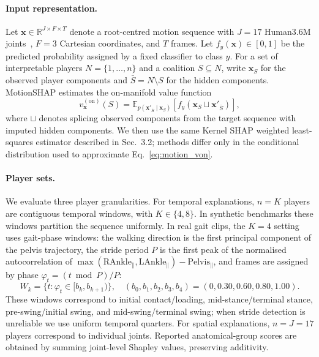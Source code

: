 
\paragraph{Input representation.}
Let $\mathbf{x}\in\mathbb{R}^{J\times F\times T}$ denote a root-centred motion sequence with $J{=}17$ Human3.6M joints~\citep{ionescu2014human36m}, $F{=}3$ Cartesian coordinates, and $T$ frames.  Let $f_y(\mathbf{x})\in[0,1]$ be the predicted probability assigned by a fixed classifier to class $y$.  For a set of interpretable players $N=\{1,\ldots,n\}$ and a coalition $S\subseteq N$, write $\mathbf{x}_S$ for the observed player components and $\bar S=N\setminus S$ for the hidden components.  MotionSHAP estimates the on-manifold value function
\begin{equation}
  v^{(\mathrm{on})}_{\mathbf{x}}(S)
  =
  \mathbb{E}_{p(\mathbf{x}'_{\bar S}\mid \mathbf{x}_S)}
  \left[
    f_y\!\left(\mathbf{x}_S\sqcup \mathbf{x}'_{\bar S}\right)
  \right],
  \label{eq:motion_von}
\end{equation}
where $\sqcup$ denotes splicing observed components from the target sequence with imputed hidden components.  We then use the same Kernel SHAP weighted least-squares estimator described in Sec.~3.2; methods differ only in the conditional distribution used to approximate Eq.~\eqref{eq:motion_von}.

\paragraph{Player sets.}
We evaluate three player granularities.  For temporal explanations, $n=K$ players are contiguous temporal windows, with $K\in\{4,8\}$.  In synthetic benchmarks these windows partition the sequence uniformly.  In real gait clips, the $K{=}4$ setting uses gait-phase windows: the walking direction is the first principal component of the pelvis trajectory, the stride period $P$ is the first peak of the normalised autocorrelation of $\max(\mathrm{RAnkle}_{\parallel},\mathrm{LAnkle}_{\parallel})-\mathrm{Pelvis}_{\parallel}$, and frames are assigned by phase $\varphi_t=(t\bmod P)/P$:
\begin{equation}
  W_k=\{t:\varphi_t\in[b_k,b_{k+1})\},
  \quad
  (b_0,b_1,b_2,b_3,b_4)=(0,0.30,0.60,0.80,1.00).
  \label{eq:windows}
\end{equation}
These windows correspond to initial contact/loading, mid-stance/terminal stance, pre-swing/initial swing, and mid-swing/terminal swing; when stride detection is unreliable we use uniform temporal quarters.  For spatial explanations, $n=J=17$ players correspond to individual joints.  Reported anatomical-group scores are obtained by summing joint-level Shapley values, preserving additivity.

